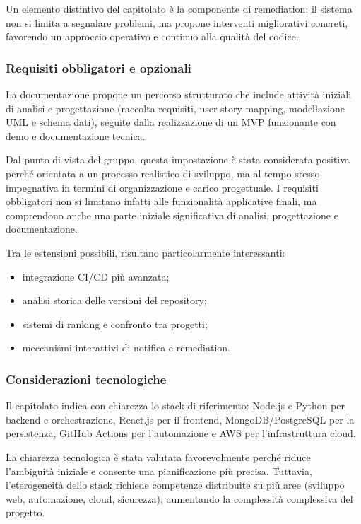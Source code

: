 \documentclass[a4paper,12pt]{article}
\begin{document}
Un elemento distintivo del capitolato è la componente di remediation: il sistema non si limita a segnalare problemi, ma propone interventi migliorativi concreti, favorendo un approccio operativo e continuo alla qualità del codice.

\subsubsection{Requisiti obbligatori e opzionali}

La documentazione propone un percorso strutturato che include attività iniziali di analisi e progettazione (raccolta requisiti, user story mapping, modellazione UML e schema dati), seguite dalla realizzazione di un MVP funzionante con demo e documentazione tecnica.

Dal punto di vista del gruppo, questa impostazione è stata considerata positiva perché orientata a un processo realistico di sviluppo, ma al tempo stesso impegnativa in termini di organizzazione e carico progettuale. I requisiti obbligatori non si limitano infatti alle funzionalità applicative finali, ma comprendono anche una parte iniziale significativa di analisi, progettazione e documentazione.

Tra le estensioni possibili, risultano particolarmente interessanti:

\begin{itemize}
    \item integrazione CI/CD più avanzata;
    \item analisi storica delle versioni del repository;
    \item sistemi di ranking e confronto tra progetti;
    \item meccanismi interattivi di notifica e remediation.
\end{itemize}

\subsubsection{Considerazioni tecnologiche}

Il capitolato indica con chiarezza lo stack di riferimento: Node.js e Python per backend e orchestrazione, React.js per il frontend, MongoDB/PostgreSQL per la persistenza, GitHub Actions per l'automazione e AWS per l'infrastruttura cloud.

La chiarezza tecnologica è stata valutata favorevolmente perché riduce l'ambiguità iniziale e consente una pianificazione più precisa. Tuttavia, l'eterogeneità dello stack richiede competenze distribuite su più aree (sviluppo web, automazione, cloud, sicurezza), aumentando la complessità complessiva del progetto.
\end{document}
